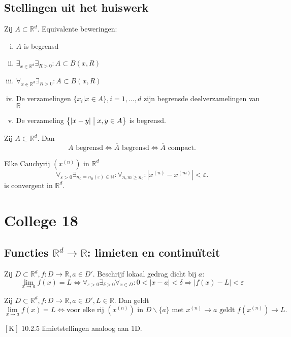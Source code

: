 \documentclass{2wa40summary}
\begin{document}
	\subsection{Stellingen uit het huiswerk}
		\theorem Zij $A \subset \mathbb{R}^d$. Equivalente beweringen:
			\begin{enumerate}[(i)]
				\item $A$ is begrensd
				\item $\exists _{x \in \mathbb{R}^d} \exists _{R>0}: A \subset B(x,R)$
      			\item $\forall _{x \in \mathbb{R}^d} \exists _{R>0}: A \subset B(x,R)$
      			\item De verzamelingen $\{ x_i | x \in A \}, i=1,\dots,d$ zijn begrensde deelverzamelingen van $\mathbb{R}$
      			\item De verzameling $\big\{|x-y| \bigm| x,y \in A \big\}$ is begrensd.
			\end{enumerate}
		
		\theorem Zij $A \subset \mathbb{R}^d$. Dan \[A \text{ begrensd} \Leftrightarrow \overline{A} \text{ begrensd} \Leftrightarrow \overline{A}\text{ compact}.\]
		
		\theorem Elke Cauchyrij $(x^{(n)})$ in $\mathbb{R}^d$  \[\forall _{\varepsilon >0} \exists _{n_0=n_0(\varepsilon )\in \mathbb{N}}:\forall _{n,m \geq n_0}: |x^{(n)}-x^{(m)}| < \varepsilon.\] is convergent in $\mathbb{R}^d$.
	
\newpage
\section{College 18}
	\subsection{Functies $\mathbb{R}^d \rightarrow \mathbb{R}$: limieten en continu\"iteit}
		Zij $D \subset \mathbb{R}^d, f: D\rightarrow \mathbb{R}, a \in D'$.
		  Beschrijf lokaal gedrag dicht bij $a$:
		\[ \lim_{x\rightarrow a}f(x)=L \Leftrightarrow \forall _{\varepsilon >0} \exists _{\delta >0} \forall _{x \in D}: 0<|x-a|<\delta \Rightarrow |f(x)-L|<\varepsilon\]
		
		\theorem Zij $D \subset \mathbb{R}^d, f:D\rightarrow \mathbb{R}, a \in D', L \in \mathbb{R}$. Dan geldt
		\[ \lim_{x \rightarrow a} f(x)=L \Leftrightarrow \text{voor elke rij } (x^{(n)}) \text{ in } D\backslash\{a\} \text{ met } x^{(n)}\rightarrow a \text{ geldt } f(x^{(n)}) \rightarrow L.\]
		
		\opm $\left[\text{K}\right]$ 10.2.5 limietstellingen analoog aan 1D.
		
\end{document}
